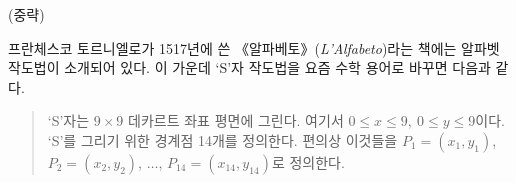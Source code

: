 (중략)
\bigskip
\begin{figure}
\end{figure}


프란체스코 토르니엘로가 1517년에 쓴
《알파베토》({\small \textit{L'Alfabeto}})라는 책에는 알파벳 작도법이 소개되어 있다. 
이 가운데 `S'자 작도법을 요즘 수학 용어로 바꾸면 다음과 같다. 

\begin{quote}
\sffamily
`S'자는 $9 \times 9$ 데카르트 좌표 평면에 그린다. 여기서 $0 \le x \le
9,\ 0 \le y \le 9 $이다. `S'를 그리기 위한 경계점 14개를
정의한다. 편의상 이것들을 $P_1=(x_1, y_1)$, $P_2=(x_2, y_2)$, $\ldots$,
$P_{14}=(x_{14},y_{14})$로 정의한다. 
\end{quote}

